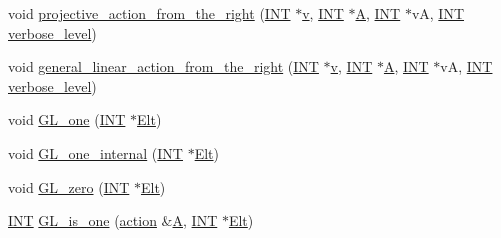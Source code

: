 \begin{DoxyCompactItemize}
\item 
void \mbox{\hyperlink{classmatrix__group_a9cd8bfb088a31889bb49f8ec8327db15}{projective\+\_\+action\+\_\+from\+\_\+the\+\_\+right}} (\mbox{\hyperlink{galois_8h_a09fddde158a3a20bd2dcadb609de11dc}{I\+NT}} $\ast$\mbox{\hyperlink{simeon_8_c_aeb3f3030944801b163bc3b829a7f6710}{v}}, \mbox{\hyperlink{galois_8h_a09fddde158a3a20bd2dcadb609de11dc}{I\+NT}} $\ast$\mbox{\hyperlink{simeon_8_c_a97833f04c3a9c008df5521a2fc291bb4}{A}}, \mbox{\hyperlink{galois_8h_a09fddde158a3a20bd2dcadb609de11dc}{I\+NT}} $\ast$vA, \mbox{\hyperlink{galois_8h_a09fddde158a3a20bd2dcadb609de11dc}{I\+NT}} \mbox{\hyperlink{simeon_8_c_a818073fbcc2f439e7c56952f67386122}{verbose\+\_\+level}})
\item 
void \mbox{\hyperlink{classmatrix__group_a889580a8a77a61365a371b76d108dc03}{general\+\_\+linear\+\_\+action\+\_\+from\+\_\+the\+\_\+right}} (\mbox{\hyperlink{galois_8h_a09fddde158a3a20bd2dcadb609de11dc}{I\+NT}} $\ast$\mbox{\hyperlink{simeon_8_c_aeb3f3030944801b163bc3b829a7f6710}{v}}, \mbox{\hyperlink{galois_8h_a09fddde158a3a20bd2dcadb609de11dc}{I\+NT}} $\ast$\mbox{\hyperlink{simeon_8_c_a97833f04c3a9c008df5521a2fc291bb4}{A}}, \mbox{\hyperlink{galois_8h_a09fddde158a3a20bd2dcadb609de11dc}{I\+NT}} $\ast$vA, \mbox{\hyperlink{galois_8h_a09fddde158a3a20bd2dcadb609de11dc}{I\+NT}} \mbox{\hyperlink{simeon_8_c_a818073fbcc2f439e7c56952f67386122}{verbose\+\_\+level}})
\item 
void \mbox{\hyperlink{classmatrix__group_a00890c674cedb856ad2c358aedb25b21}{G\+L\+\_\+one}} (\mbox{\hyperlink{galois_8h_a09fddde158a3a20bd2dcadb609de11dc}{I\+NT}} $\ast$\mbox{\hyperlink{simeon_8_c_aec1406935bdb1fee3561fcb840964100}{Elt}})
\item 
void \mbox{\hyperlink{classmatrix__group_a308f9c0bb3c627134bf6d63a5c0721e9}{G\+L\+\_\+one\+\_\+internal}} (\mbox{\hyperlink{galois_8h_a09fddde158a3a20bd2dcadb609de11dc}{I\+NT}} $\ast$\mbox{\hyperlink{simeon_8_c_aec1406935bdb1fee3561fcb840964100}{Elt}})
\item 
void \mbox{\hyperlink{classmatrix__group_af22c97524c6a2667c4371cb228e47cc9}{G\+L\+\_\+zero}} (\mbox{\hyperlink{galois_8h_a09fddde158a3a20bd2dcadb609de11dc}{I\+NT}} $\ast$\mbox{\hyperlink{simeon_8_c_aec1406935bdb1fee3561fcb840964100}{Elt}})
\item 
\mbox{\hyperlink{galois_8h_a09fddde158a3a20bd2dcadb609de11dc}{I\+NT}} \mbox{\hyperlink{classmatrix__group_ad2b498fce43b085fa40c2efbc8dd7fd7}{G\+L\+\_\+is\+\_\+one}} (\mbox{\hyperlink{classaction}{action}} \&\mbox{\hyperlink{simeon_8_c_a97833f04c3a9c008df5521a2fc291bb4}{A}}, \mbox{\hyperlink{galois_8h_a09fddde158a3a20bd2dcadb609de11dc}{I\+NT}} $\ast$\mbox{\hyperlink{simeon_8_c_aec1406935bdb1fee3561fcb840964100}{Elt}})

\end{DoxyCompactItemize}
